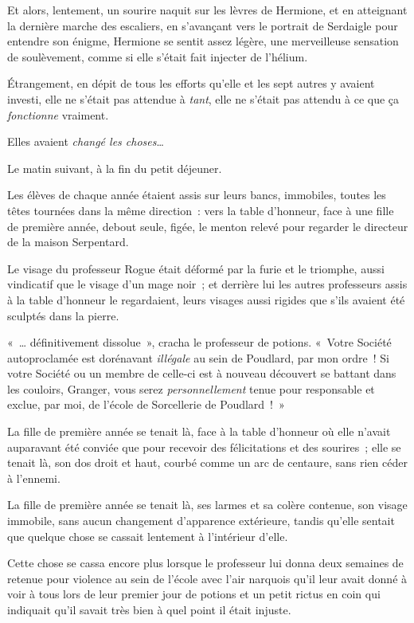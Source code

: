 Et alors, lentement, un sourire naquit sur les lèvres de Hermione, et en atteignant la dernière marche des escaliers, en s'avançant vers le portrait de Serdaigle pour entendre son énigme, Hermione se sentit assez légère, une merveilleuse sensation de soulèvement, comme si elle s'était fait injecter de l'hélium.

Étrangement, en dépit de tous les efforts qu'elle et les sept autres y avaient investi, elle ne s'était pas attendue à \emph{tant}, elle ne s'était pas attendu à ce que ça \emph{fonctionne} vraiment.

Elles avaient \emph{changé les choses}…

\later

Le matin suivant, à la fin du petit déjeuner.

Les élèves de chaque année étaient assis sur leurs bancs, immobiles, toutes les têtes tournées dans la même direction~: vers la table d'honneur, face à une fille de première année, debout seule, figée, le menton relevé pour regarder le directeur de la maison Serpentard.

Le visage du professeur Rogue était déformé par la furie et le triomphe, aussi vindicatif que le visage d'un mage noir~; et derrière lui les autres professeurs assis à la table d'honneur le regardaient, leurs visages aussi rigides que s'ils avaient été sculptés dans la pierre.

«~… définitivement dissolue~», cracha le professeur de potions.
«~Votre Société autoproclamée est dorénavant \emph{illégale} au sein de Poudlard, par mon ordre~!
Si votre Société ou un membre de celle-ci est à nouveau découvert se battant dans les couloirs, Granger, vous serez \emph{personnellement} tenue pour responsable et exclue, par moi, de l'école de Sorcellerie de Poudlard~!~»

La fille de première année se tenait là, face à la table d'honneur où elle n'avait auparavant été conviée que pour recevoir des félicitations et des sourires~; elle se tenait là, son dos droit et haut, courbé comme un arc de centaure, sans rien céder à l'ennemi.

La fille de première année se tenait là, ses larmes et sa colère contenue, son visage immobile, sans aucun changement d'apparence extérieure, tandis qu'elle sentait que quelque chose se cassait lentement à l'intérieur d'elle.

Cette chose se cassa encore plus lorsque le professeur lui donna deux semaines de retenue pour violence au sein de l'école avec l'air narquois qu'il leur avait donné à voir à tous lors de leur premier jour de potions et un petit rictus en coin qui indiquait qu'il savait très bien à quel point il était injuste.

